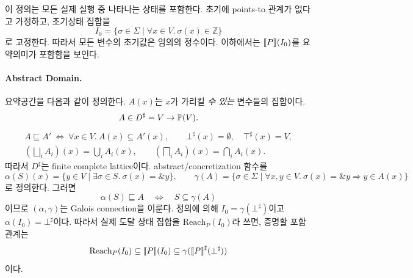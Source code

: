 \documentclass[a4paper, 10pt]{article}
\begin{document}
이 정의는 모든 실제 실행 중 나타나는 상태를 포함한다.
초기에 points-to 관계가 없다고 가정하고, 초기상태 집합을
\[
 I_0=\{\sigma\in\Sigma\mid\forall x\in V.~\sigma(x)\in\mathbb Z\}
\]
로 고정한다. 따라서 모든 변수의 초기값은 임의의 정수이다.
이하에서는 ${\llbracket P \rrbracket}(I_0)$를 요약의미가 포함함을 보인다.

\paragraph{Abstract Domain.}
요약공간을 다음과 같이 정의한다. $A(x)$는 $x$가 가리킬 \emph{수 있는} 변수들의 집합이다.
\[
 A\in D^\sharp=V\rightarrow{}\mathbb{P}(V).
\]
\[
\begin{gathered}
 A\sqsubseteq A'\ \Longleftrightarrow\
       \forall x\in V.\ A(x)\subseteq A'(x),\qquad
 \bot^\sharp(x)=\emptyset,\quad\top^\sharp(x)=V,\\
 \left(\bigsqcup_i A_i\right)(x)=\bigcup_i A_i(x),
 \qquad
 \left(\bigsqcap_i A_i\right)(x)=\bigcap_i A_i(x).
\end{gathered}
\]
따라서 $D^\sharp$는 finite complete lattice이다. abstract/concretization 함수를
\[
 \alpha(S)(x)=\{y\in V\mid\exists\sigma\in S.\ \sigma(x)=\&y\},
 \qquad
 \gamma(A)=\{\sigma\in\Sigma\mid
    \forall x,y\in V.\ \sigma(x)=\&y\Rightarrow y\in A(x)\}
\]
로 정의한다. 그러면
\[
 \alpha(S)\sqsubseteq A\quad\Longleftrightarrow\quad S\subseteq\gamma(A)
\]
이므로 $(\alpha,\gamma)$는 Galois connection을 이룬다.
정의에 의해 $I_0=\gamma(\bot^\sharp)$이고 $\alpha(I_0)=\bot^\sharp$이다.
따라서 실제 도달 상태 집합을 $\mathrm{Reach}_P(I_0)$라 쓰면, 증명할 포함관계는
\[
 \mathrm{Reach}_P(I_0)\subseteq{\llbracket P \rrbracket}(I_0)
 \subseteq\gamma({\llbracket P \rrbracket}^{\sharp}(\bot^\sharp))
\]
이다.

\newpage
\end{document}
